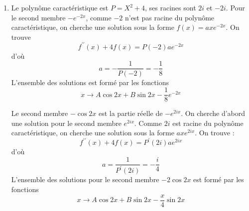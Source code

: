 \begin{enumerate}
\item Le polynôme caractéristique est $P=X^2+4$, ses racines sont $2i$ et $-2i$.\newline
Pour le second membre $-e^{-2x}$, comme $-2$ n'est pas racine du polynôme caractéristique, on cherche une solution sous la forme $f(x)=axe^{-2x}$. On trouve
\[f^{\prime\prime}(x)+4f(x)=P(-2)ae^{-2x}\]
d'où
\[a=-\frac{1}{P(-2)}=-\frac{1}{8}\]
L'ensemble des solutions est formé par les fonctions
\[x\rightarrow A\cos 2x +B \sin 2x -\frac{1}{8}e^{-2x}\]

Le second membre $-\cos 2x$ est la partie réelle de $-e^{2ix}$. On cherche d'abord une solution pour le second membre $e^{2ix}$. Comme $2i$ est racine du polynôme caractéristique, on cherche une solution sous la forme $axe^{2ix}$. On trouve :
\[f^{\prime\prime}(x)+4f(x)=P^\prime(2i)ae^{2ix}\]
d'où
\[a=\frac{1}{P^\prime(2i)}=-\frac{i}{4}\]
L'ensemble des solutions pour le second membre $-2\cos 2x$ est formé par les fonctions
\[x\rightarrow A\cos 2x +B \sin 2x -\frac{x}{4}\sin 2x\]

\end{enumerate}
